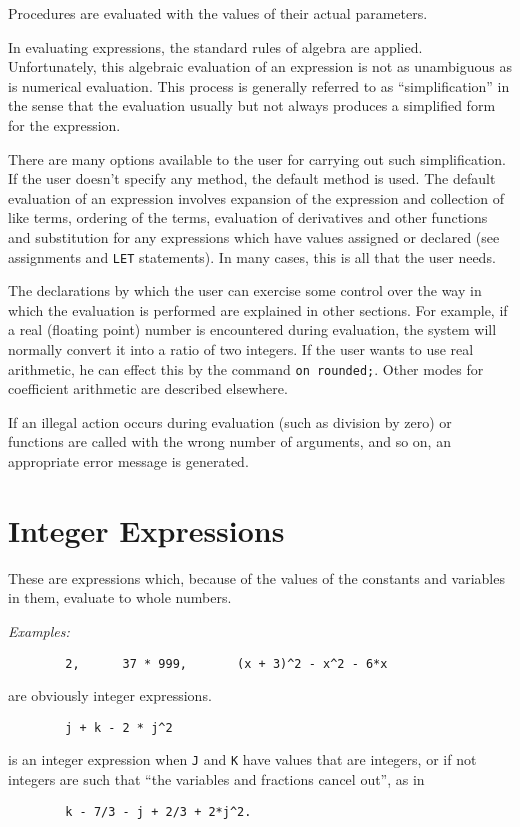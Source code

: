 Procedures are evaluated with the values of their actual parameters.

In evaluating expressions, the standard rules of algebra are applied.
Unfortunately, this algebraic evaluation of an expression is not as
unambiguous as is numerical evaluation. This process is generally referred
to as ``simplification'' in the sense that the
evaluation usually but not always produces a simplified form for the
expression.

There are many options available to the user for carrying out such
simplification.  If the user doesn't specify any
method, the default method is used.  The default evaluation of an
expression involves expansion of the expression and collection of like
terms, ordering of the terms, evaluation of derivatives and other
functions and substitution for any expressions which have values assigned
or declared (see assignments and {\tt LET} statements).  In many cases,
this is all that the user needs.

The declarations by which the user can exercise some control over the way
in which the evaluation is performed are explained in other sections.  For
example, if a real (floating point) number is encountered during
evaluation, the system will normally convert it into a ratio of two
integers.  If the user wants to use real arithmetic, he can effect this by
the command {\tt on rounded;}. Other modes for
coefficient arithmetic are described elsewhere.

If an illegal action occurs during evaluation (such as division by zero)
or functions are called with the wrong number of arguments, and so on, an
appropriate error message is generated.

\section{Integer Expressions}

These are expressions which, because of the values of the
constants and variables in them, evaluate to whole numbers.

{\it Examples:}
\begin{verbatim}
        2,      37 * 999,       (x + 3)^2 - x^2 - 6*x
\end{verbatim}
are obviously integer expressions.
\begin{verbatim}
        j + k - 2 * j^2
\end{verbatim}
is an integer expression when {\tt J} and {\tt K} have values that are
integers, or if not integers are such that ``the variables and fractions
cancel out'', as in
\begin{verbatim}
        k - 7/3 - j + 2/3 + 2*j^2.
\end{verbatim}

